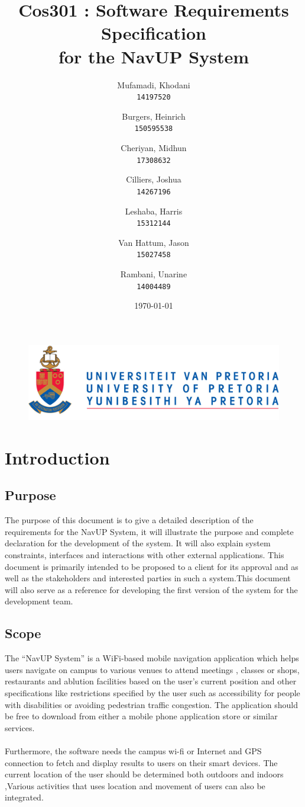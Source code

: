 \documentclass[english]{article}
\author{
	Mufamadi, Khodani\\
	\texttt{14197520}
	\and
	Burgers, Heinrich\\
	\texttt{150595538}
	\and
	Cheriyan, Midhun\\
	\texttt{17308632}
	\and
	Cilliers, Joshua\\
	\texttt{14267196}
	\and
	Leshaba, Harris\\
	\texttt{15312144}
	\and
	Van Hattum, Jason\\
	\texttt{15027458}
	\and
	Rambani, Unarine\\
	\texttt{14004489}
}
\title{Cos301 : Software Requirements Specification\\
	for the NavUP System\\
	}
\date{\today}
\begin{document}
	\maketitle
	\begin{figure}[!t]
		\includegraphics{up_logo.png}
	\end{figure}
	\newpage

	\tableofcontents
	\newpage

	

	\section{Introduction}
			

		\subsection{Purpose}
			The purpose of this document is to give a detailed description of the requirements for the NavUP System, it  will illustrate the purpose and complete declaration for the development of the system. It will also explain system constraints, interfaces and interactions with other external applications. This document is primarily intended to be proposed to a client for its approval 					and as well as the stakeholders and interested parties in such a system.This document  will also serve as a reference for developing the first version of the system for the development team.

		\subsection{Scope}
			The “NavUP System” is a  WiFi-based mobile navigation application which helps users navigate on campus to various venues to attend meetings , classes or shops, restaurants and ablution facilities based on the user’s current position and other specifications like restrictions specified by the user such as accessibility for people with disabilities or avoiding pedestrian traffic 					congestion. The application should be free to download from either a mobile phone application store or similar services.\\
			\\
			Furthermore, the software needs the campus wi-fi  or Internet and GPS connection to fetch and display results to users on their smart devices. The current location of the user should be determined both outdoors and indoors ,Various activities that uses location and movement of users can also be integrated.
\end{document}
